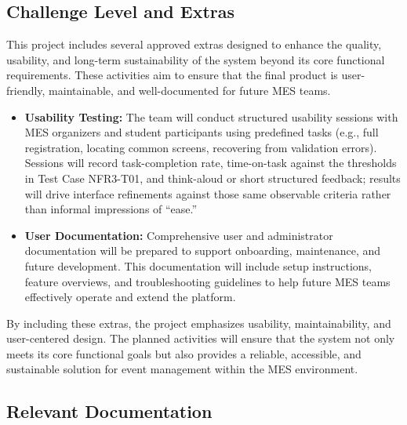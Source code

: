 \documentclass[12pt, titlepage]{article}
\begin{document}
\subsection{Challenge Level and Extras}

This project includes several approved extras designed to enhance the quality, usability, and long-term sustainability of the system beyond its core functional requirements. These activities aim to ensure that the final product is user-friendly, maintainable, and well-documented for future MES teams.

\begin{itemize}
    \item \textbf{Usability Testing:} The team will conduct structured usability sessions with MES organizers and student participants using predefined tasks (e.g., full registration, locating common screens, recovering from validation errors). Sessions will record task-completion rate, time-on-task against the thresholds in Test Case NFR3-T01, and think-aloud or short structured feedback; results will drive interface refinements against those same observable criteria rather than informal impressions of ``ease.''
    \item \textbf{User Documentation:} Comprehensive user and administrator documentation will be prepared to support onboarding, maintenance, and future development. This documentation will include setup instructions, feature overviews, and troubleshooting guidelines to help future MES teams effectively operate and extend the platform.
\end{itemize}

By including these extras, the project emphasizes usability, maintainability, and user-centered design. The planned activities will ensure that the system not only meets its core functional goals but also provides a reliable, accessible, and sustainable solution for event management within the MES environment.
\subsection{Relevant Documentation}
\end{document}
